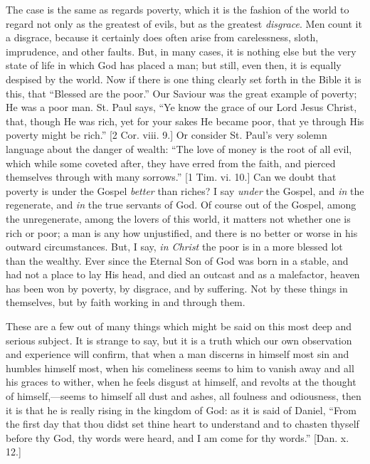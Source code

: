 The case is the same as regards poverty, which it is the fashion of
the world to regard not only as the greatest of evils, but as the
greatest \emph{disgrace}. Men count it a disgrace, because it
certainly does often arise from carelessness, sloth, imprudence, and
other faults. But, in many cases, it is nothing else but the very
state of life in which God has placed a man; but still, even then, it
is equally despised by the world. Now if there is one thing clearly
set forth in the Bible it is this, that ``Blessed are the
poor.'' Our Saviour was the great example of poverty; He was a
poor man. St. Paul says, ``Ye know the grace of our Lord Jesus
Christ, that, though He was rich, yet for your sakes He became poor,
that ye through His poverty might be rich.'' [2 Cor. viii. 9.] Or
consider St. Paul's very solemn language about the danger of wealth:
``The love of money is the root of all evil, which while some
coveted after, they have erred from the faith, and pierced themselves
through with many sorrows.'' [1 Tim. vi. 10.] Can we doubt that
poverty is under the Gospel \emph{better} than riches? I say \emph{under}
the Gospel, and \emph{in} the regenerate, and \emph{in} the true
servants of God. Of course out of the Gospel, among the unregenerate,
among the lovers of this world, it matters not whether one is rich or
poor; a man is any how unjustified, and there is no better or worse in
his outward circumstances. But, I say, \emph{in Christ} the poor is in
a more blessed lot than the wealthy. Ever since the Eternal Son of God
was born in a stable, and had not a place to lay His head, and died an
outcast and as a malefactor, heaven has been won by poverty, by
disgrace, and by suffering. Not by these things in themselves, but by
faith working in and through them.

These are a few out of many things which might be said on this most
deep and serious subject. It is strange to say, but it is a truth
which our own observation and experience will confirm, that when a man
discerns in himself most sin and humbles himself most, when his
comeliness seems to him to vanish away and all his graces to wither,
when he feels disgust at himself, and revolts at the thought of
himself,—seems to himself all dust and ashes, all foulness and
odiousness, then it is that he is really rising in the kingdom of God:
as it is said of Daniel, ``From the first day that thou didst set
thine heart to understand and to chasten thyself before thy God, thy
words were heard, and I am come for thy words.'' [Dan. x. 12.]

